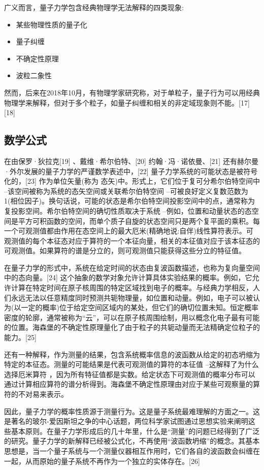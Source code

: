 广义而言，量子力学包含经典物理学无法解释的四类现象:
\begin{itemize}
\item 某些物理性质的量子化
\item 量子纠缠
\item 不确定性原理
\item 波粒二象性
\end{itemize}
然而，后来在2018年10月，有物理学家研究称，对于单粒子，量子行为可以用经典物理学来解释，但对于多个粒子，如量子纠缠和相关的非定域现象则不能。[17][18]

\subsection{ 数学公式}
在由保罗·狄拉克[19] 、戴维·希尔伯特、[20] 约翰·冯·诺依曼、[21] 还有赫尔曼·外尔发展的量子力学的严谨数学表述中，[22] 量子力学系统的可能状态是被符号化的，[23] 作为单位矢量(称为 态矢)中。形式上，它们位于复可分希尔伯特空间中 –该空间被称为系统的态矢空间或关联希尔伯特空间  –可被良好定义复数范数为1(相位因子)。换句话说，可能的状态是希尔伯特空间投影空间中的点，通常称为复投影空间。希尔伯特空间的确切性质取决于系统 –例如，位置和动量状态的态空间是平方可积函数的空间，而单个质子自旋的状态空间只是两个复平面的乘积。每一个可观测值都由作用在态空间上的最大厄米(精确地说:自伴)线性算符表示。可观测值的每个本征态对应于算符的一个本征向量，相关的本征值对应于该本征态的可观测值。如果算符的谱是分立的，则可观测值只能获得这些分立的特征值。

在量子力学的形式中，系统在给定时间的状态由复波函数描述，也称为复向量空间中的态向量。[24] 这个抽象的数学对象允许计算具体实验结果的概率。例如，它允许计算在特定时间在原子核周围的特定区域找到电子的概率。与经典力学相反，人们永远无法以任意精度同时预测共轭物理量，如位置和动量。例如，电子可以被认为(以一定的概率)位于给定空间区域内的某处，但它们的确切位置未知。恒定概率密度的轮廓，通常被称为“云”，可以在原子核周围绘制，用以概念化电子最有可能的位置。海森堡的不确定性原理量化了由于粒子的共轭动量而无法精确定位粒子的能力。[25]

还有一种解释，作为测量的结果，包含系统概率信息的波函数从给定的初态坍缩为特定的本征态。测量的可能结果是代表可观测值的算符的本征值 –这解释了为什么选择厄米算符 ，因为所有特征值都是实数。给定状态下可观测值的概率分布可以通过计算相应算符的谱分析得到。海森堡不确定性原理由对应于某些可观察量的算符的不对易来表示。

因此，量子力学的概率性质源于测量行为。这是量子系统最难理解的方面之一。这是著名的玻尔-爱因斯坦之争的中心话题，两位科学家试图通过思想实验来阐明这些基本原则。在量子力学形成后的几十年里，什么是“测量”的问题已经得到了广泛的研究。量子力学的新解释已经被公式化，不再使用“波函数坍缩”的概念。其基本思想是，当一个量子系统与一个测量仪器相互作用时，它们各自的波函数会纠缠在一起，从而原始的量子系统不再作为一个独立的实体存在。[26]

